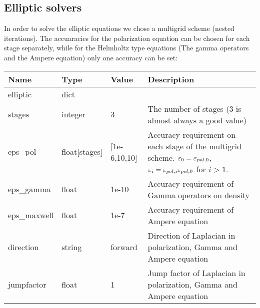 \subsection{Elliptic solvers}
In order to solve the elliptic equations we chose a multigrid scheme (nested
iterations). The accuaracies for the polarization equation can be chosen for
each stage separately, while for the Helmholtz type equations (The gamma
operators and the Ampere equation) only one accuracy can be set:
\begin{longtable}{lllp{7cm}}
\toprule
\rowcolor{gray!50}\textbf{Name} &  \textbf{Type} & \textbf{Value}  & \textbf{Description}  \\ \midrule
elliptic & dict & & \\
\qquad stages & integer & 3  &  The number of stages (3 is almost always a good value)\\
\qquad eps\_pol    & float[stages] & [1e-6,10,10] & Accuracy requirement on each stage of the multigrid scheme. $\varepsilon_0 = \varepsilon_{pol,0}$, $\varepsilon_i = \varepsilon_{pol,i} \varepsilon_{pol,0}$  for $i>1$. \\
\qquad eps\_gamma    & float & 1e-10 & Accuracy requirement of Gamma operators on density \\
\qquad eps\_maxwell    & float & 1e-7 & Accuracy requirement of Ampere equation\\
\qquad direction & string & forward & Direction of Laplacian in polarization, Gamma and Ampere equation\\
\qquad jumpfactor & float & 1 & Jump factor of Laplacian in polarization, Gamma and Ampere equation\\
\bottomrule
\end{longtable}

